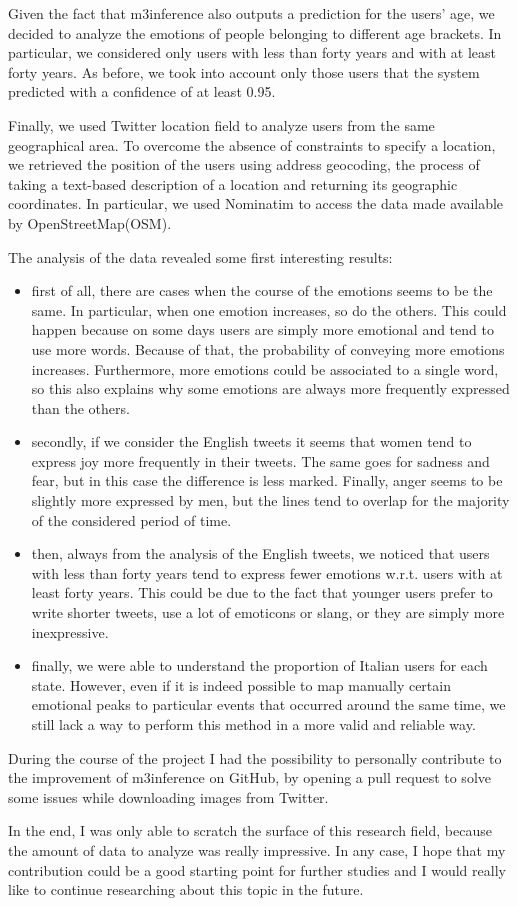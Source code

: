 Given the fact that m3inference also outputs a prediction for the users' age, we decided to analyze the emotions of people belonging to different age brackets. In particular, we considered only users with less than forty years and with at least forty years. As before, we took into account only those users that the system predicted with a confidence of at least 0.95. 

Finally, we used Twitter location field to analyze users from the same geographical area. To overcome the absence of constraints to specify a location, we retrieved the position of the users using address geocoding, the process of taking a text-based description of a location and returning its geographic coordinates. In particular, we used Nominatim to access the data made available by OpenStreetMap(OSM).

The analysis of the data revealed some first interesting results:

\begin{itemize}
	\item first of all, there are cases when the course of the emotions seems to be the same. In particular, when one emotion increases, so do the others. This could happen because on some days users are simply more emotional and tend to use more words. Because of that, the probability of conveying more emotions increases. Furthermore, more emotions could be associated to a single word, so this also explains why some emotions are always more frequently expressed than the others.
	\item secondly, if we consider the English tweets it seems that women tend to express joy more frequently in their tweets. The same goes for sadness and fear, but in this case the difference is less marked. Finally, anger seems to be slightly more expressed by men, but the lines tend to overlap for the majority of the considered period of time.
	\item then, always from the analysis of the English tweets, we noticed that users with less than forty years tend to express fewer emotions w.r.t. users with at least forty years. This could be due to the fact that younger users prefer to write shorter tweets, use a lot of emoticons or slang, or they are simply more inexpressive.
	\item finally, we were able to understand the proportion of Italian users for each state. However, even if it is indeed possible to map manually certain emotional peaks to particular events that occurred around the same time, we still lack a way to perform this method in a more valid and reliable way.
\end{itemize}

During the course of the project I had the possibility to personally contribute to the improvement of m3inference on GitHub, by opening a pull request to solve some issues while downloading images from Twitter.

In the end, I was only able to scratch the surface of this research field, because the amount of data to analyze was really impressive. In any case, I hope that my contribution could be a good starting point for further studies and I would really like to continue researching about this topic in the future.